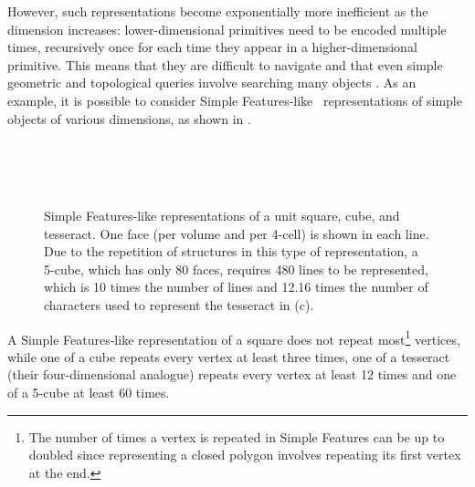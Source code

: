 \newsavebox{\sfsiidbox}
\begin{lrbox}{\sfsiidbox}
\begin{minipage}{\overflowingheadlen}

\end{minipage}
\end{lrbox}

\newsavebox{\sfsiiidbox}
\begin{lrbox}{\sfsiiidbox}
\begin{minipage}{\overflowingheadlen}

\end{minipage}
\end{lrbox}

\newsavebox{\sfsivdbox}
\begin{lrbox}{\sfsivdbox}
\begin{minipage}{\overflowingheadlen}

\end{minipage}
\end{lrbox}

\newsavebox{\sfsvdbox}
\begin{lrbox}{\sfsvdbox}
\begin{minipage}{\overflowingheadlen}

\end{minipage}
\end{lrbox}

However, such representations become exponentially more inefficient as the dimension increases: lower-dimensional primitives need to be encoded multiple times, recursively once for each time they appear in a higher-dimensional primitive.
This means that they are difficult to navigate and that even simple geometric and topological queries involve searching many objects \citep{Hazelton98}.
As an example, it is possible to consider Simple Features-like~\citep{SimpleFeatures1} representations of simple objects of various dimensions, as shown in .
\begin{figure}[p]
\subfloat[square]{\usebox{\sfsiidbox}\label{subfig:sfs2d}}\\
\subfloat[cube]{\usebox{\sfsiiidbox}\label{subfig:sfs3d}}\\
\subfloat[tesseract]{\usebox{\sfsivdbox}\label{subfig:sfs4d}}\\
\caption[Simple Features representations of a square, cube, and tesseract]{Simple Features-like representations of a unit square, cube, and tesseract. One face (per volume and per 4-cell) is shown in each line.
Due to the repetition of structures in this type of representation, a 5-cube, which has only 80 faces, requires 480 lines to be represented, which is 10 times the number of lines and 12.16 times the number of characters used to represent the tesseract in (c).}
\label{fig:sfsnd}
\end{figure}
A Simple Features-like representation of a square does not repeat most\footnote{The number of times a vertex is repeated in Simple Features can be up to doubled since representing a closed polygon involves repeating its first vertex at the end.} vertices, while one of a cube repeats every vertex at least three times, one of a tesseract (their four-dimensional analogue) repeats every vertex at least 12 times and one of a 5-cube at least 60 times.

